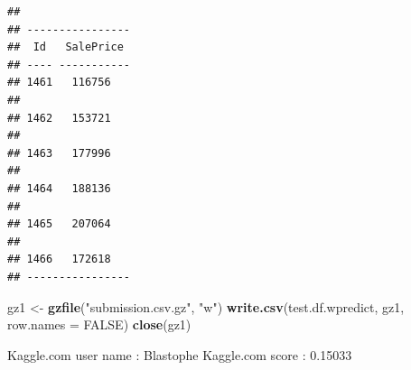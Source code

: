 \documentclass[]{article}
\newenvironment{Shaded}{\begin{snugshade}}{\end{snugshade}}
\newcommand{\KeywordTok}[1]{\textcolor[rgb]{0.13,0.29,0.53}{\textbf{{#1}}}}
\newcommand{\DataTypeTok}[1]{\textcolor[rgb]{0.13,0.29,0.53}{{#1}}}
\newcommand{\DecValTok}[1]{\textcolor[rgb]{0.00,0.00,0.81}{{#1}}}
\newcommand{\StringTok}[1]{\textcolor[rgb]{0.31,0.60,0.02}{{#1}}}
\newcommand{\OtherTok}[1]{\textcolor[rgb]{0.56,0.35,0.01}{{#1}}}
\newcommand{\NormalTok}[1]{{#1}}
\begin{document}
\begin{Shaded}
\end{Shaded}

\begin{verbatim}
## 
## ----------------
##  Id   SalePrice 
## ---- -----------
## 1461   116756   
## 
## 1462   153721   
## 
## 1463   177996   
## 
## 1464   188136   
## 
## 1465   207064   
## 
## 1466   172618   
## ----------------
\end{verbatim}

\begin{Shaded}
\begin{Highlighting}[]
\NormalTok{gz1 <-}\StringTok{ }\KeywordTok{gzfile}\NormalTok{(}\StringTok{"submission.csv.gz"}\NormalTok{, }\StringTok{"w"}\NormalTok{)}
\KeywordTok{write.csv}\NormalTok{(test.df.wpredict, gz1, }\DataTypeTok{row.names =} \OtherTok{FALSE}\NormalTok{)}
\KeywordTok{close}\NormalTok{(gz1)}
\end{Highlighting}
\end{Shaded}

Kaggle.com user name : Blastophe Kaggle.com score : 0.15033
\end{document}
